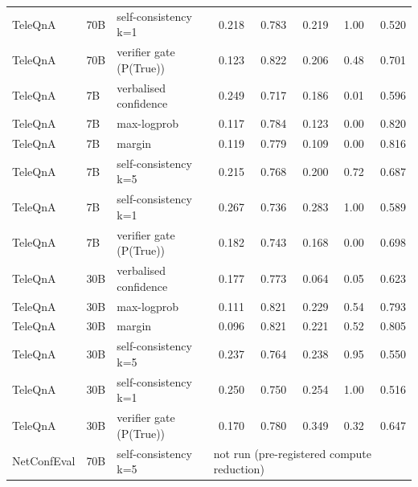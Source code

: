 \begin{tabular}{lllrrrrr}
TeleQnA & 70B & self-consistency k=1 & 0.218 & 0.783 & 0.219 & 1.00 & 0.520 \\
TeleQnA & 70B & verifier gate (P(True)) & 0.123 & 0.822 & 0.206 & 0.48 & 0.701 \\
TeleQnA & 7B & verbalised confidence & 0.249 & 0.717 & 0.186 & 0.01 & 0.596 \\
TeleQnA & 7B & max-logprob & 0.117 & 0.784 & 0.123 & 0.00 & 0.820 \\
TeleQnA & 7B & margin & 0.119 & 0.779 & 0.109 & 0.00 & 0.816 \\
TeleQnA & 7B & self-consistency k=5 & 0.215 & 0.768 & 0.200 & 0.72 & 0.687 \\
TeleQnA & 7B & self-consistency k=1 & 0.267 & 0.736 & 0.283 & 1.00 & 0.589 \\
TeleQnA & 7B & verifier gate (P(True)) & 0.182 & 0.743 & 0.168 & 0.00 & 0.698 \\
TeleQnA & 30B & verbalised confidence & 0.177 & 0.773 & 0.064 & 0.05 & 0.623 \\
TeleQnA & 30B & max-logprob & 0.111 & 0.821 & 0.229 & 0.54 & 0.793 \\
TeleQnA & 30B & margin & 0.096 & 0.821 & 0.221 & 0.52 & 0.805 \\
TeleQnA & 30B & self-consistency k=5 & 0.237 & 0.764 & 0.238 & 0.95 & 0.550 \\
TeleQnA & 30B & self-consistency k=1 & 0.250 & 0.750 & 0.254 & 1.00 & 0.516 \\
TeleQnA & 30B & verifier gate (P(True)) & 0.170 & 0.780 & 0.349 & 0.32 & 0.647 \\
NetConfEval & 70B & self-consistency k=5 & \multicolumn{5}{l}{not run (pre-registered compute reduction)} \\
\bottomrule
\end{tabular}
